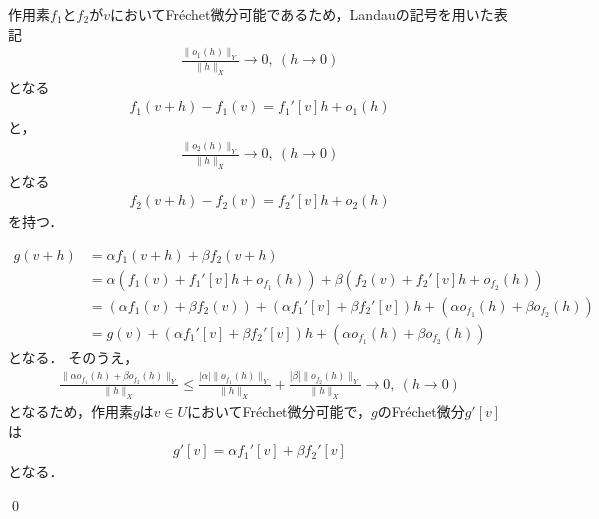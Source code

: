 \begin{Proof}
作用素$f_1$と$f_2$が$v$においてFr\'echet微分可能であるため，Landauの記号を用いた表記
\begin{align*}
  \frac{\| o_1( h ) \|_{Y}  }{ \| h \|_{X} } \rightarrow 0, ~ (h \rightarrow 0)
\end{align*}
となる
\begin{align*}
  f_1(v + h) - f_1(v) =  f_1'[v] h + o_1( h )
\end{align*}
と，
\begin{align*}
  \frac{\| o_2( h ) \|_{Y}  }{ \| h \|_{X} } \rightarrow 0, ~ (h \rightarrow 0)
\end{align*}
となる
\begin{align*}
  f_2(v + h) - f_2(v) =  f_2'[v] h + o_2( h )
\end{align*}
を持つ．

\begin{align*}
g(v + h) &= \alpha f_1(v + h) + \beta f_2( v + h ) \\
&= \alpha \left( f_1(v) + f_1'[v] h + o_{f_1}( h ) \right) + \beta \left(  f_2(v) + f_2'[v] h + o_{f_2}( h ) \right) \\
&= \left( \alpha f_1(v) + \beta f_2(v) \right) + \left( \alpha f_1'[v] + \beta f_2'[v] \right) h +  \left( \alpha o_{f_1}( h ) + \beta  o_{f_2}( h ) \right) \\
&= g(v) +  \left( \alpha f_1'[v] + \beta f_2'[v] \right) h +  \left( \alpha o_{f_1}( h ) + \beta  o_{f_2}( h ) \right)
\end{align*}
となる．
そのうえ，
\begin{align*}
\frac{ \| \alpha o_{f_1}( h ) + \beta  o_{f_2}( h ) \|_{Y} }{ \| h \|_X } \le \frac{ | \alpha | \| o_{f_1}( h ) \|_{Y} }{\| h \|_X} + \frac{ | \beta |  \|  o_{f_2}( h ) \|_{Y} }{ \| h \|_X } \rightarrow 0, ~ (h \rightarrow 0)
\end{align*}
となるため，作用素$g$は$v \in U$においてFr\'echet微分可能で，$g$のFr\'echet微分$g'[v]$は
\begin{align*}
g'[v] = \alpha f_1'[v] + \beta f_2'[v]
\end{align*}
となる．

\qed
\end{Proof}



